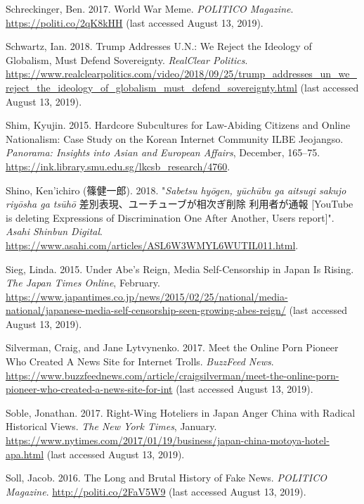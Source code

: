 \documentclass[10pt,british,A4paper,twoside]{memoir}
\begin{document}
\hypertarget{ref-schreckinger_world_2017}{}
Schreckinger, Ben. 2017. World War Meme. \emph{POLITICO Magazine}.
\url{https://politi.co/2qK8kHH} (last accessed August 13, 2019).

\hypertarget{ref-schwartz_trump_2018}{}
Schwartz, Ian. 2018. Trump Addresses U.N.: We Reject the Ideology of
Globalism, Must Defend Sovereignty. \emph{RealClear Politics}.
\url{https://www.realclearpolitics.com/video/2018/09/25/trump_addresses_un_we_reject_the_ideology_of_globalism_must_defend_sovereignty.html} (last accessed August 13, 2019).

\hypertarget{ref-shim_hardcore_2015}{}
Shim, Kyujin. 2015. Hardcore Subcultures for Law-Abiding Citizens and
Online Nationalism: Case Study on the Korean Internet Community ILBE
Jeojangso. \emph{Panorama: Insights into Asian and European Affairs},
December, 165--75.
\url{https://ink.library.smu.edu.sg/lkcsb_research/4760}.

\hypertarget{ref-shino_eng:_2018}{}
Shino, Ken'ichiro (篠健一郎). 2018. "\emph{Sabetsu hyōgen, yūchūbu ga aitsugi sakujo riyōsha ga tsūhō} 差別表現、ユーチューブが相次ぎ削除 利用者が通報 [YouTube is deleting Expressions of Discrimination One After Another, Users report]".
\emph{Asahi Shinbun Digital}.
\url{https://www.asahi.com/articles/ASL6W3WMYL6WUTIL011.html}.

\hypertarget{ref-sieg_under_2015}{}
Sieg, Linda. 2015. Under Abe's Reign, Media Self-Censorship in Japan Is
Rising. \emph{The Japan Times Online}, February.
\url{https://www.japantimes.co.jp/news/2015/02/25/national/media-national/japanese-media-self-censorship-seen-growing-abes-reign/} (last accessed August 13, 2019).

\hypertarget{ref-silverman_meet_2017}{}
Silverman, Craig, and Jane Lytvynenko. 2017. Meet the Online Porn
Pioneer Who Created A News Site for Internet Trolls. \emph{BuzzFeed
News}.
\url{https://www.buzzfeednews.com/article/craigsilverman/meet-the-online-porn-pioneer-who-created-a-news-site-for-int} (last accessed August 13, 2019).

\hypertarget{ref-soble_right-wing_2017}{}
Soble, Jonathan. 2017. Right-Wing Hoteliers in Japan Anger China with
Radical Historical Views. \emph{The New York Times}, January.
\url{https://www.nytimes.com/2017/01/19/business/japan-china-motoya-hotel-apa.html} (last accessed August 13, 2019).

\hypertarget{ref-soll_long_2016}{}
Soll, Jacob. 2016. The Long and Brutal History of Fake News.
\emph{POLITICO Magazine}. \url{http://politi.co/2FaV5W9} (last accessed August 13, 2019).
\end{document}
